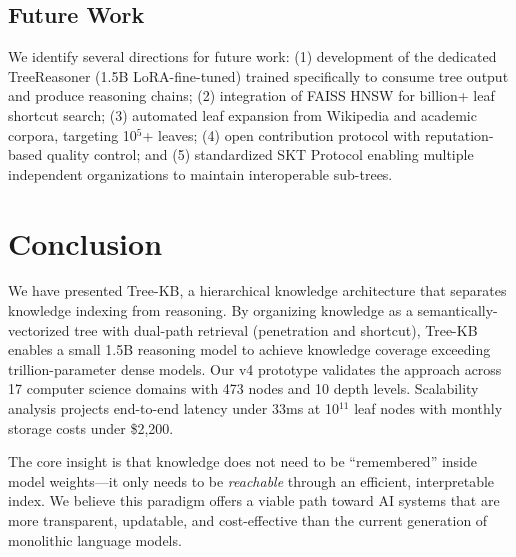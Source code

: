 \documentclass[11pt,a4paper]{article}
\begin{document}
\subsection{Future Work}

We identify several directions for future work: (1) development of the dedicated TreeReasoner (1.5B LoRA-fine-tuned) trained specifically to consume tree output and produce reasoning chains; (2) integration of FAISS HNSW for billion+ leaf shortcut search; (3) automated leaf expansion from Wikipedia and academic corpora, targeting 10$^5$+ leaves; (4) open contribution protocol with reputation-based quality control; and (5) standardized SKT Protocol enabling multiple independent organizations to maintain interoperable sub-trees.

\section{Conclusion}
\label{sec:conclusion}

We have presented Tree-KB, a hierarchical knowledge architecture that separates knowledge indexing from reasoning. By organizing knowledge as a semantically-vectorized tree with dual-path retrieval (penetration and shortcut), Tree-KB enables a small 1.5B reasoning model to achieve knowledge coverage exceeding trillion-parameter dense models. Our v4 prototype validates the approach across 17 computer science domains with 473 nodes and 10 depth levels. Scalability analysis projects end-to-end latency under 33ms at 10$^{11}$ leaf nodes with monthly storage costs under \$2,200.

The core insight is that knowledge does not need to be ``remembered'' inside model weights---it only needs to be \textit{reachable} through an efficient, interpretable index. We believe this paradigm offers a viable path toward AI systems that are more transparent, updatable, and cost-effective than the current generation of monolithic language models.
\end{document}
